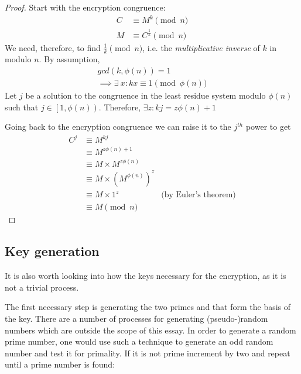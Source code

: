 \documentclass[12pt, titlepage]{article}
\begin{document}
    \begin{proof}
        Start with the encryption congruence: 
        \begin{align*}
            C & \equiv M^{k} \pmod{n}\\
            M & \equiv C^{\frac{1}{k}} \pmod{n}
        \end{align*}
        We need, therefore, to find $\frac{1}{k} \pmod{n}$, i.e. the \emph{multiplicative
        inverse} of $k$ in modulo $n$. By assumption, 
        \begin{align*}
            gcd(k, \phi (n)) = 1 \\
            \implies \exists\ x: kx \equiv 1 \pmod{\phi (n)}
        \end{align*}
        Let $j$ be a solution to the congruence in the least residue system modulo $\phi
        (n)$ such that $j \in \left[1, \phi (n) \right)$.  Therefore, $\exists z: kj = z\phi
        (n) + 1$

        Going back to the encryption congruence we can raise it to the $j^{th}$ power to get
        \begin{align*}
            C^j & \equiv M^{kj}\\ 
                & \equiv M^{z\phi (n) + 1}\\
                & \equiv M\times M^{z \phi(n)}\\
                & \equiv M\times (M^{\phi (n)})^z\\
                & \equiv M\times 1^z                &\text{(by Euler's theorem)}\\
                & \equiv M \pmod{n}
        \end{align*}
    \end{proof}
    
    \subsection{Key generation}
    It is also worth looking into how the keys necessary for the encryption, as it is not a
    trivial process.

    The first necessary step is generating the two primes  and  that form
    the basis of the key. There are a number of processes for generating (pseudo-)random
    numbers which are outside the scope of this essay. In order to generate a random prime
    number, one would use such a technique to generate an odd random number and test it for
    primality.  If it is not prime increment by two and repeat until a prime number is
    found:
    
\end{document}
